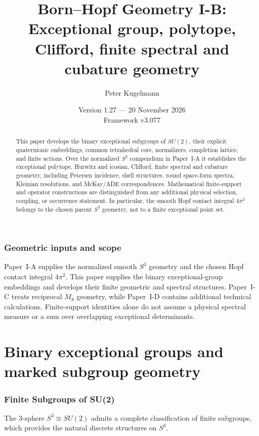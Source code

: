 \documentclass[11pt]{article}
\title{\textbf{Born--Hopf Geometry I-B:}\\[0.4em]\large Exceptional group, polytope, Clifford, finite spectral and cubature geometry}
\author{Peter Kugelmann}
\date{Version 1.27 --- 20 November 2026 \\ Framework v3.077}
\begin{document}
\maketitle
\begin{abstract}
This paper develops the binary exceptional subgroups of $SU(2)$, their
explicit quaternionic embeddings, common tetrahedral core, normalizers,
completion lattice, and finite actions.  Over the normalized $S^3$
compendium in Paper~I-A it establishes the exceptional polytope, Hurwitz
and icosian, Clifford, finite spectral and cubature geometry, including
Petersen incidence, shell structures, round space-form spectra, Kleinian
resolutions, and McKay/ADE correspondences.  Mathematical finite-support
and operator constructions are distinguished from any additional physical
selection, coupling, or occurrence statement.  In particular, the smooth
Hopf contact integral $4\pi^2$ belongs to the chosen parent $S^3$ geometry,
not to a finite exceptional point set.
\end{abstract}
\makeatletter
\renewcommand*\l@section[2]{%
  \ifnum \c@tocdepth >\z@
    \addpenalty\@secpenalty
    \addvspace{1.0em \@plus\p@}%
    \setlength\@tempdima{2.5em}%
    \begingroup
      \parindent \z@ \rightskip \@pnumwidth
      \parfillskip -\@pnumwidth
      \leavevmode \bfseries
      \advance\leftskip\@tempdima
      \hskip -\leftskip
      #1\nobreak\hfil
      \nobreak\hb@xt@\@pnumwidth{\hss #2\kern-\p@\kern\p@}\par
    \endgroup
  \fi}
\makeatother
\tableofcontents
\clearpage
\section*{Geometric inputs and scope}
Paper~I-A supplies the normalized smooth $S^3$ geometry and the chosen
Hopf contact integral $4\pi^2$.  This paper supplies the binary
exceptional-group embeddings and develops their finite geometric and
spectral structures.  Paper~I-C treats reciprocal $M_8$ geometry, while
Paper~I-D contains additional technical calculations.  Finite-support
identities alone do not assume a physical spectral measure or a sum over
overlapping exceptional determinants.

\part{Binary exceptional groups and marked subgroup geometry}

\section{Finite Subgroups of SU(2)}
\label{p1:sec:finite}
The 3-sphere $S^3 \cong SU(2)$ admits a complete classification of finite subgroups, 
which provides the natural discrete structures on $S^3$.
\end{document}
